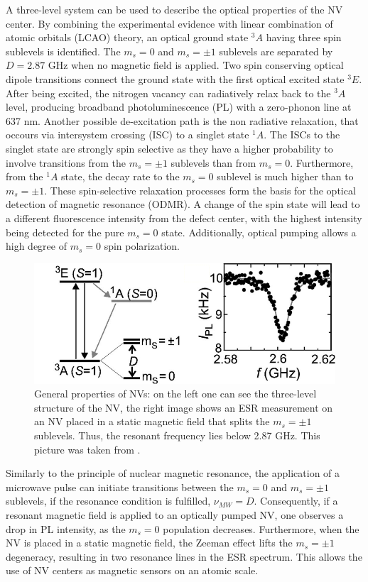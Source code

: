 \documentclass[12pt,a4paper]{article}
\begin{document}
A three-level system can be used to describe the optical properties of the NV center. By combining the experimental evidence with linear combination of atomic orbitals (LCAO) theory\cite{lar}, an optical ground state $^3A$ having three spin sublevels is identified. The $m_s=0$ and $m_s= \pm 1$ sublevels are separated by $D=2.87$ GHz when no magnetic field is applied. Two spin conserving optical dipole transitions connect the ground state with the first optical excited state $^3E$. After being excited, the nitrogen vacancy can radiatively relax back to the $^3A$ level, producing broadband photoluminescence (PL) with a zero-phonon line at 637 nm. Another possible de-excitation path is the non radiative relaxation, that occours via intersystem crossing (ISC) to a singlet state $^1A$. The ISCs to the singlet state are strongly spin selective as they have a higher probability to involve transitions from the $m_s=\pm 1$ sublevels than from $m_s=0$. Furthermore, from the $^1A$ state, the decay rate to the $m_s=0$ sublevel is much higher than to $m_s=\pm 1$. These spin-selective relaxation processes form the basis for the optical detection of magnetic resonance (ODMR). A change of the spin state will lead to a different fluorescence intensity from the defect center, with the highest intensity being detected for the pure $m_s=0$ state. Additionally, optical pumping allows a high degree of $m_s=0$ spin polarization. \\
\begin{figure}[H]
\centering
\includegraphics[scale=0.4]{energy_levels.png} 
\caption{General properties of NVs: on the left one can see the three-level structure of the NV, the right image shows an ESR measurement on an NV placed in a static magnetic field that splits the $m_s=\pm1$ sublevels. Thus, the resonant frequency lies below 2.87 GHz. This picture was taken from \cite{nv1}.}
\label{el}
\end{figure}
Similarly to the principle of nuclear magnetic resonance, the application of a microwave pulse can initiate transitions between the $m_s=0$ and $m_s=\pm1$ sublevels, if the resonance condition is fulfilled, $\nu_{MW}=D$. Consequently, if a resonant magnetic field is applied to an optically pumped NV, one observes a drop in PL intensity, as the $m_s=0$ population decreases. Furthermore, when the NV is placed in a static magnetic field, the Zeeman effect lifts the $m_s=\pm 1$ degeneracy, resulting in two resonance lines in the ESR spectrum. This allows the use of NV centers as magnetic sensors on an atomic scale\cite{repprog}\cite{nv1}. \\
\end{document}
